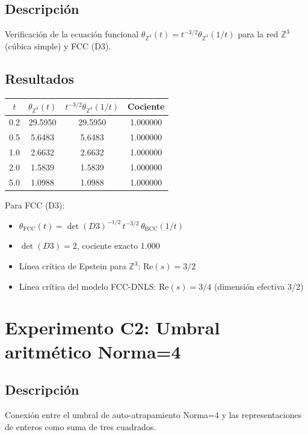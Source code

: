 \documentclass[12pt]{article}
\begin{document}
\subsection{Descripci\'on}
Verificaci\'on de la ecuaci\'on funcional $\theta_{\mathbb{Z}^3}(t) = t^{-3/2}\theta_{\mathbb{Z}^3}(1/t)$ para la red $\mathbb{Z}^3$ (c\'ubica simple) y FCC (D3).

\subsection{Resultados}
\begin{center}
\begin{tabular}{cccc}
\toprule
$t$ & $\theta_{\mathbb{Z}^3}(t)$ & $t^{-3/2}\theta_{\mathbb{Z}^3}(1/t)$ & Cociente \\
\midrule
0.2 & 29.5950 & 29.5950 & 1.000000 \\
0.5 & 5.6483 & 5.6483 & 1.000000 \\
1.0 & 2.6632 & 2.6632 & 1.000000 \\
2.0 & 1.5839 & 1.5839 & 1.000000 \\
5.0 & 1.0988 & 1.0988 & 1.000000 \\
\bottomrule
\end{tabular}
\end{center}

Para FCC (D3):
\begin{itemize}
  \item $\theta_{\text{FCC}}(t) = \det(D3)^{-1/2}\,t^{-3/2}\,\theta_{\text{BCC}}(1/t)$
  \item $\det(D3) = 2$, cociente exacto 1.000
  \item L\'inea cr\'itica de Epstein para $\mathbb{Z}^3$: $\text{Re}(s) = 3/2$
  \item L\'inea cr\'itica del modelo FCC-DNLS: $\text{Re}(s) = 3/4$ (dimensi\'on efectiva 3/2)
\end{itemize}

\section{Experimento C2: Umbral aritm\'etico Norma=4}

\subsection{Descripci\'on}
Conexi\'on entre el umbral de auto-atrapamiento Norma=4 y las representaciones de enteros como suma de tres cuadrados.
\end{document}
